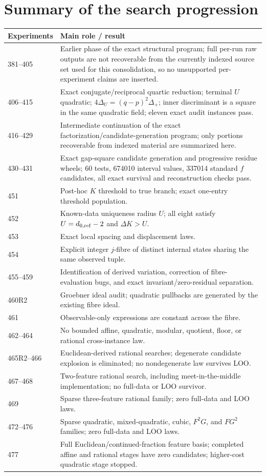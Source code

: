 \documentclass[11pt,a4paper]{article}
\begin{document}
\section{Summary of the search progression}
\begin{longtable}{p{2.4cm}p{10.5cm}}
\toprule
Experiments & Main role / result\\
\midrule
381--405 & Earlier phase of the exact structural program; full per-run raw outputs are not recoverable from the currently indexed source set used for this consolidation, so no unsupported per-experiment claims are inserted.\\
406--415 & Exact conjugate/reciprocal quartic reduction; terminal $U$ quadratic; $4\Delta_U=(q-p)^2\Delta_+$; inner discriminant is a square in the same quadratic field; eleven exact audit instances pass.\\
416--429 & Intermediate continuation of the exact factorization/candidate-generation program; only portions recoverable from indexed material are summarized here.\\
430--431 & Exact gap-square candidate generation and progressive residue wheels; 60 tests, 674010 interval values, 337014 standard $f$ candidates, all exact survival and reconstruction checks pass.\\
451 & Post-hoc $K$ threshold to true branch; exact one-entry threshold population.\\
452 & Known-data uniqueness radius $U$; all eight satisfy $U=d_{0,\rm ref}-2$ and $\Delta K>U$.\\
453 & Exact local spacing and displacement laws.\\
454 & Explicit integer $j$-fibre of distinct internal states sharing the same observed tuple.\\
455--459 & Identification of derived variation, correction of fibre-evaluation bugs, and exact invariant/zero-residual separation.\\
460R2 & Groebner ideal audit; quadratic pullbacks are generated by the existing fibre ideal.\\
461 & Observable-only expressions are constant across the fibre.\\
462--464 & No bounded affine, quadratic, modular, quotient, floor, or rational cross-instance law.\\
465R2--466 & Euclidean-derived rational searches; degenerate candidate explosion is eliminated; no nondegenerate law survives LOO.\\
467--468 & Two-feature rational search, including meet-in-the-middle implementation; no full-data or LOO survivor.\\
469 & Sparse three-feature rational family; zero full-data and LOO laws.\\
472--476 & Sparse quadratic, mixed-quadratic, cubic, $F^2G$, and $FG^2$ families; zero full-data and LOO laws.\\
477 & Full Euclidean/continued-fraction feature basis; completed affine and rational stages have zero candidates; higher-cost quadratic stage stopped.\\\bottomrule
\end{longtable}
\end{document}
